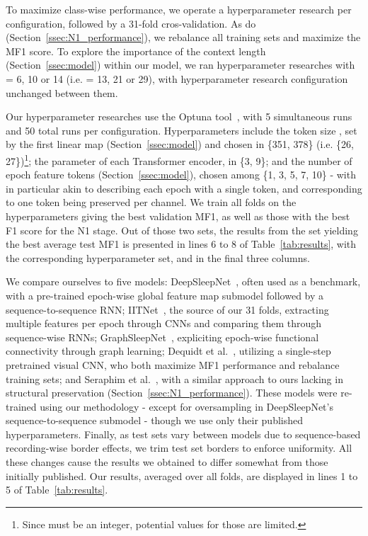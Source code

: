 \documentclass{article}
\makeatletter
\newcommand\footnoteref[1]{\protected@xdef\@thefnmark{\ref{#1}}\@footnotemark}
\makeatother
\begin{document}
To maximize class-wise performance, we operate a hyperparameter research per configuration, followed by a 31-fold cros-validation. As do~\cite{paul,CAIP_article} (Section~\ref{ssec:N1_performance}), we rebalance all training sets and maximize the MF1 score. 
To explore the importance of the context length  (Section~\ref{ssec:model}) within our model, we ran hyperparameter researches with  = 6, 10 or 14 (i.e.  = 13, 21 or 29), with hyperparameter research configuration unchanged between them.

Our hyperparameter researches use the Optuna tool~\cite{akiba2019optuna}, with 5 simultaneous runs and 50 total runs per configuration. Hyperparameters include\footnoteref{fn:Git} the token size , set by the first linear map (Section~\ref{ssec:model}) and chosen in \{351, 378\} (i.e.   \{26, 27\})\footnote{\label{fn:d/h}Since  must be an integer, potential values for those are limited.};
the  parameter of each Transformer encoder, in \{3, 9\}\footnoteref{fn:d/h};
and the number of epoch feature tokens  (Section~\ref{ssec:model}), chosen among \{1, 3, 5, 7, 10\} - with in particular  akin to describing each epoch with a single token, and  corresponding to one token being preserved per channel.
We train all folds on the hyperparameters giving the best validation MF1, as well as those with the best F1 score for the N1 stage. Out of those two sets, the results from the set yielding the best average test MF1 is presented in lines 6 to 8 of Table~\ref{tab:results}, with the corresponding hyperparameter set,  and  in the final three columns.

We compare ourselves to five models:
DeepSleepNet~\cite{Supratak2017}, often used as a benchmark, with a pre-trained epoch-wise global feature map submodel followed by a sequence-to-sequence RNN;
IITNet~\cite{SEO2020102037}, the source of our 31 folds, extracting multiple features per epoch through CNNs and comparing them through sequence-wise RNNs;
GraphSleepNet~\cite{jia2020graphsleepnet}, expliciting epoch-wise functional connectivity through graph learning;
Dequidt et al.~\cite{paul}, utilizing a single-step pretrained visual CNN, who both maximize MF1 performance and rebalance training sets;
and Seraphim et al.~\cite{CAIP_article}, with a similar approach to ours lacking in structural preservation (Section~\ref{ssec:N1_performance}).
These models were re-trained using our methodology - except for oversampling in DeepSleepNet's sequence-to-sequence submodel - though we use only their published hyperparameters.
Finally, as test sets vary between models due to sequence-based recording-wise border effects, we trim test set borders to enforce uniformity.
All these changes cause the results we obtained to differ somewhat from those initially published.
Our results, averaged over all folds, are displayed in lines 1 to 5 of Table~\ref{tab:results}.
\end{document}
